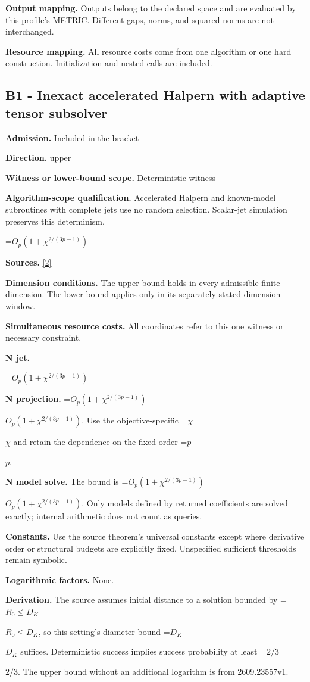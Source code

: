 \documentclass[10pt,a4paper]{article}
\newcommand{\AtlasMath}[1]{\par\begingroup\centering\setbox0=\hbox{$\displaystyle #1$}\ifdim\wd0>1.4\linewidth\typeout{ATLAS WIDE FORMULA: \the\wd0}\fi\ifdim\wd0>\linewidth\resizebox{\linewidth}{!}{\box0}\else\box0\fi\par\endgroup}
\newcommand{\AtlasInlineMath}[1]{\begingroup\setbox0=\hbox{$#1$}\ifdim\wd0>.4\linewidth\endgroup\AtlasMath{#1}\else\endgroup$#1$\fi}
\begin{document}
\textbf{Output mapping.} Outputs belong to the declared space and are evaluated by this profile's METRIC. Different gaps, norms, and squared norms are not interchanged.

\textbf{Resource mapping.} All resource costs come from one algorithm or one hard construction. Initialization and nested calls are included.

\subsection{B1 - Inexact accelerated Halpern with adaptive tensor subsolver}
\textbf{Admission.} Included in the bracket

\textbf{Direction.} upper

\textbf{Witness or lower-bound scope.} Deterministic witness

\textbf{Algorithm-scope qualification.} Accelerated Halpern and known-model subroutines with complete jets use no random selection. Scalar-jet simulation preserves this determinism.

\AtlasMath{O_p(1+\chi^{2/(3p-1)})}
\textbf{Sources.} \href{https://arxiv.org/pdf/2609.23557v1}{[2]}

\textbf{Dimension conditions.} The upper bound holds in every admissible finite dimension. The lower bound applies only in its separately stated dimension window.

\textbf{Simultaneous resource costs.} All coordinates refer to this one witness or necessary constraint.

\textbf{N jet.}

\AtlasMath{O_p(1+\chi^{2/(3p-1)})}
\textbf{N projection.} \AtlasInlineMath{O_p\!\left(1+\chi^{2/(3p-1)}\right)}. Use the objective-specific \AtlasInlineMath{\chi} and retain the dependence on the fixed order \AtlasInlineMath{p}.

\textbf{N model solve.} The bound is \AtlasInlineMath{O_p\!\left(1+\chi^{2/(3p-1)}\right)}. Only models defined by returned coefficients are solved exactly; internal arithmetic does not count as queries.

\textbf{Constants.} Use the source theorem’s universal constants except where derivative order or structural budgets are explicitly fixed. Unspecified sufficient thresholds remain symbolic.

\textbf{Logarithmic factors.} None.

\textbf{Derivation.} The source assumes initial distance to a solution bounded by \AtlasInlineMath{R_0\le D_K}, so this setting's diameter bound \AtlasInlineMath{D_K} suffices. Deterministic success implies success probability at least \AtlasInlineMath{2/3}. The upper bound without an additional logarithm is from 2609.23557v1.
\end{document}
